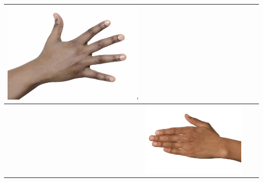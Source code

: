 \begin{longtable}{|N||c|c|c|}
\begin{minipage}{.29\textwidth}
    \includegraphics[width=\textwidth,height=\textheight,keepaspectratio]{../rc_test/outputs/20170516_proportional_test/hand_dark_to_hand_pale.jpg}
  \end{minipage} \\
\hline  \label{row:prop_test_hand_brown_to_hand_dark} &
  \begin{minipage}{.29\textwidth}
    \includegraphics[width=\textwidth,height=\textheight,keepaspectratio]{../inputs/hand_brown.jpg}
  \end{minipage} & 
  \begin{minipage}{.29\textwidth}

\end{minipage}
\end{longtable}
